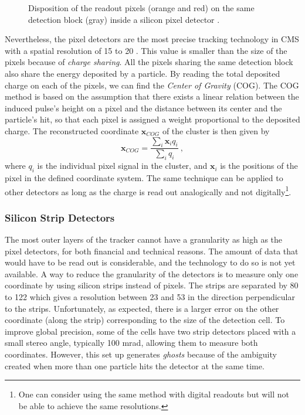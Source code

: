     \begin{figure}[h!]
      \centering
      \caption{Disposition of the readout pixels (orange and red) on the same detection block (gray) inside a silicon pixel detector \Cite{CMS_Tracker_Construction}.}
      \label{fig:lhc_and_cms__cms_pixel_detector}
    \end{figure}

    Nevertheless, the pixel detectors are the most precise tracking technology in CMS with a spatial resolution of 15 to 20 \um{}. This value is smaller than the size of the pixels because of \emph{charge sharing}. All the pixels sharing the same detection block also share the energy deposited by a particle. By reading the total deposited charge on each of the pixels, we can find the \emph{Center of Gravity} (COG). The COG method is based on the assumption that there exists a linear relation between the induced pulse's height on a pixel and the distance between its center and the particle's hit, so that each pixel is assigned a weight proportional to the deposited charge. The reconstructed coordinate $ \mathbf{x}_{COG} $ of the cluster is then given by
    \begin{equation}
      \mathbf{x}_{COG} = \frac{\sum_i \mathbf{x}_i q_i}{\sum_i q_i} \ ,
      \label{eq:lhc_and_cms__charge_sharing}
    \end{equation}
    where $ q_i $ is the individual pixel signal in the cluster, and $ \mathbf{x}_i $ is the positions of the pixel in the defined coordinate system. The same technique can be applied to other detectors as long as the charge is read out analogically and not digitally\footnote{One can consider using the same method with digital readouts but will not be able to achieve the same resolutions.}.

  \subsubsection{Silicon Strip Detectors}
  \label{sec:lhc_and_cms__silicon_strip_detectors}

    The most outer layers of the tracker cannot have a granularity as high as the pixel detectors, for both financial and technical reasons. The amount of data that would have to be read out is considerable, and the technology to do so is not yet available. A way to reduce the granularity of the detectors is to measure only one coordinate by using silicon strips instead of pixels. The strips are separated by 80 to 122 \um{} which gives a resolution between 23 \um{} and 53 \um{} in the direction perpendicular to the strips. Unfortunately, as expected, there is a larger error on the other coordinate (along the strip) corresponding to the size of the detection cell. To improve global precision, some of the cells have two strip detectors placed with a small stereo angle, typically 100 mrad, allowing them to measure both coordinates. However, this set up generates \emph{ghosts} because of the ambiguity created when more than one particle hits the detector at the same time.

